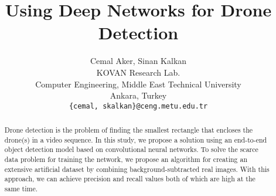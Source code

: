 \documentclass[10pt,twocolumn,letterpaper]{article}
\begin{document}
\title{Using Deep Networks for Drone Detection}

\author{Cemal Aker, Sinan Kalkan\\
KOVAN Research Lab.\\
Computer Engineering, Middle East Technical University\\
Ankara, Turkey\\
{\tt\small \{cemal, skalkan\}@ceng.metu.edu.tr}
}
\maketitle


\begin{abstract}
Drone detection is the problem of finding the smallest rectangle that encloses the drone(s) in a video sequence. In this study, we propose a solution using an end-to-end object detection model based on convolutional neural networks. To solve the scarce data problem for training the network, we propose an algorithm for creating an extensive artificial dataset by combining background-subtracted real images. With this approach, we can achieve precision and recall values both of which are high at the same time.
\end{abstract}

\end{document}
